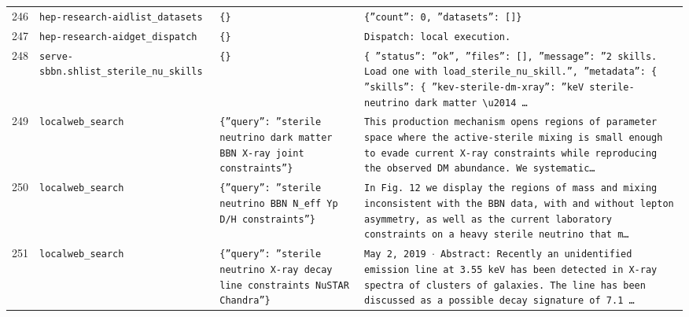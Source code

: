 \documentclass[11pt,a4paper]{article}
\begin{document}
\begin{longtable}{@{}p{}p{}p{}p{}@{}}
246 & \texttt{hep-research-aid}\newline\texttt{list\_\allowbreak{}datasets} & \texttt{\{\}\allowbreak{}} & \texttt{\{''count'':\allowbreak{} 0,\allowbreak{} ''datasets'':\allowbreak{} []\allowbreak{}\}\allowbreak{}} \\
247 & \texttt{hep-research-aid}\newline\texttt{get\_\allowbreak{}dispatch} & \texttt{\{\}\allowbreak{}} & \texttt{Dispatch:\allowbreak{} local execution.} \\
248 & \texttt{serve-sbbn.sh}\newline\texttt{list\_\allowbreak{}sterile\_\allowbreak{}nu\_\allowbreak{}skills} & \texttt{\{\}\allowbreak{}} & \texttt{\{   ''status'':\allowbreak{} ''ok'',\allowbreak{}   ''files'':\allowbreak{} []\allowbreak{},\allowbreak{}   ''message'':\allowbreak{} ''2 skills. Load one with load\_\allowbreak{}sterile\_\allowbreak{}nu\_\allowbreak{}skill.'',\allowbreak{}   ''metadata'':\allowbreak{} \{     ''skills'':\allowbreak{} \{       ''kev-sterile-dm-xray'':\allowbreak{} ''keV sterile-neutrino dark matter \textbackslash{}\allowbreak{}u2014 \ldots{}\allowbreak{}} \\
249 & \texttt{local}\newline\texttt{web\_\allowbreak{}search} & \texttt{\{''query'':\allowbreak{} ''sterile neutrino dark matter BBN X-ray joint constraints''\}\allowbreak{}} & \texttt{This production mechanism opens regions of parameter space where the active-sterile mixing is small enough to evade current X-ray constraints while reproducing the observed DM abundance. We systematic\ldots{}\allowbreak{}} \\
250 & \texttt{local}\newline\texttt{web\_\allowbreak{}search} & \texttt{\{''query'':\allowbreak{} ''sterile neutrino BBN N\_\allowbreak{}eff Yp D/\allowbreak{}H constraints''\}\allowbreak{}} & \texttt{In Fig. 12 we display the regions of mass and mixing inconsistent with the BBN data,\allowbreak{} with and without lepton asymmetry,\allowbreak{} as well as the current laboratory constraints on a heavy sterile neutrino that m\ldots{}\allowbreak{}} \\
251 & \texttt{local}\newline\texttt{web\_\allowbreak{}search} & \texttt{\{''query'':\allowbreak{} ''sterile neutrino X-ray decay line constraints NuSTAR Chandra''\}\allowbreak{}} & \texttt{May 2,\allowbreak{} 2019 $\cdot$ Abstract:\allowbreak{} Recently an unidentified emission line at 3.55 keV has been detected in X-ray spectra of clusters of galaxies. The line has been discussed as a possible decay signature of 7.1 \ldots{}\allowbreak{}} \\

\end{longtable}
\end{document}
